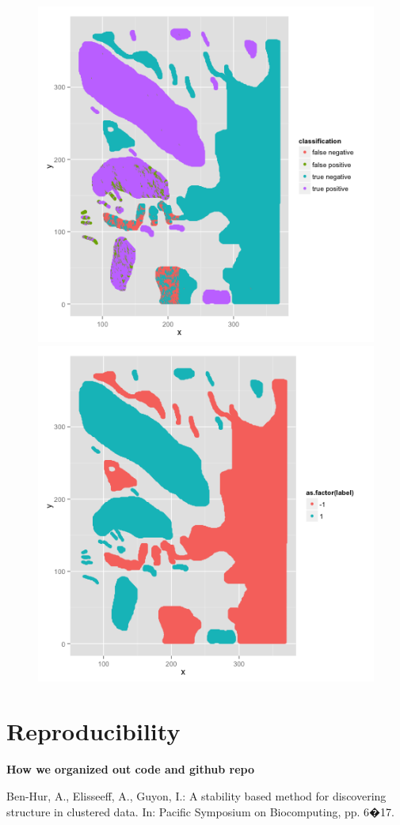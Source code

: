 \documentclass{article}\usepackage[]{graphicx}\usepackage[]{color}
\begin{document}
\begin{figure}[H]
  \includegraphics[width=\linewidth, height = 180pts ]{classification_11.png}
\endminipage\hfill
{}
  \includegraphics[width=\linewidth, height = 180pts]{label_11.png}
\endminipage\hfill
\end{figure}


\section{Reproducibility}

{\bf How we organized out code and github repo}


 \begin{thebibliography}{1}

 Ben-Hur, A., Elisseeff, A., Guyon, I.: A stability based method for discovering structure in clustered data. In: Pacific Symposium on Biocomputing, pp. 6�17.   
\end{thebibliography}
\end{document}

